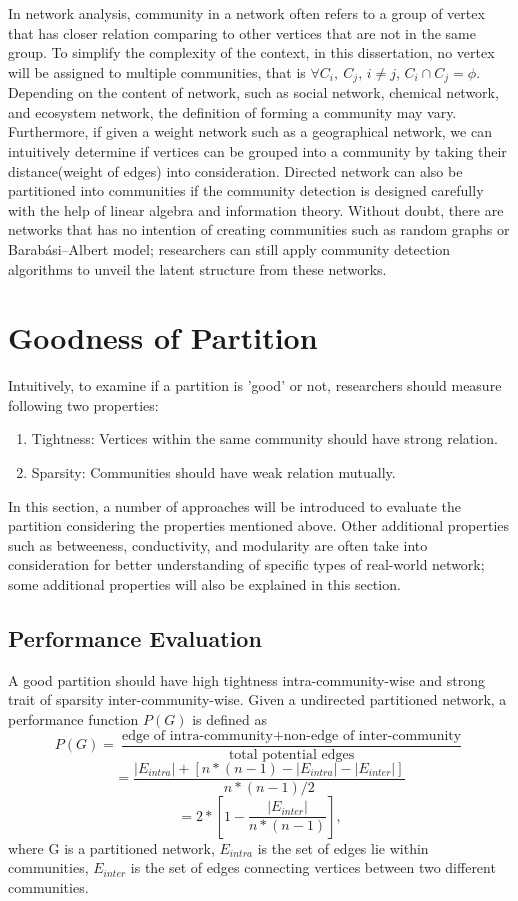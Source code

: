 \documentclass[12pt]{article}
\begin{document}
In network analysis, community in a network often refers to a group of vertex that has closer relation comparing to other vertices that are not in the same group. To simplify the complexity of the context, in this dissertation, no vertex will be assigned to multiple communities, that is $\forall C_i,\ C_j \text{, } i \neq j$, $C_i \cap C_j = \phi$. Depending on the content of network, such as social network, chemical network, and ecosystem network, the definition of forming a community may vary. Furthermore, if given a weight network such as a geographical network, we can intuitively determine if vertices can be grouped into a community by taking their distance(weight of edges) into consideration. Directed network can also be partitioned into communities if the community detection is designed carefully with the help of linear algebra and information theory\cite{4}. Without doubt, there are networks that has no intention of creating communities such as random graphs or Barabási–Albert model\cite{5}; researchers can still apply community detection algorithms to unveil the latent structure from these networks.

\section{Goodness of Partition}

Intuitively, to examine if a partition is 'good' or not, researchers should measure following two properties: 
\begin{enumerate}[label=(\alph*)]
\item Tightness: Vertices within the same community should have strong relation.
\item Sparsity: Communities should have weak relation mutually.
\end{enumerate}

In this section, a number of approaches will be introduced to evaluate the partition considering the properties mentioned above. Other additional properties such as betweeness, conductivity, and modularity are often take into consideration for better understanding of specific types of real-world network\cite{7,8}; some additional properties will also be explained in this section.

\subsection{Performance Evaluation}
A good partition should have high tightness intra-community-wise and strong trait of sparsity inter-community-wise. Given a undirected partitioned network, a performance function $P(G)$ is defined as
$$P(G) = \frac{\text{edge of intra-community} + \text{non-edge of inter-community}}{\text{total potential edges}}$$
$$=\frac{|E_{intra}| + [n*(n-1) - |E_{intra}| - |E_{inter}|]}{n*(n-1)/2}$$
$$=2*\left[ 1 - \frac{ |E_{inter}| } { n*\left( n-1 \right) }  \right],$$
where G is a partitioned network, $E_{intra}$ is the set of edges lie within communities, $E_{inter}$ is the set of edges connecting vertices between two different communities. 
\end{document}
